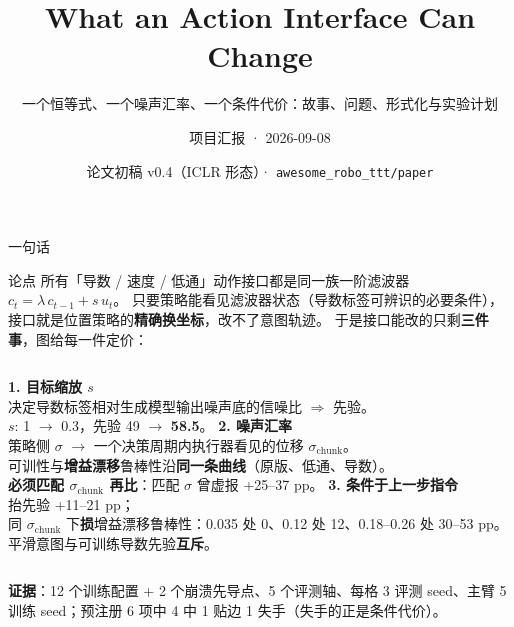 \documentclass[10pt,aspectratio=169]{beamer}
\title[What an Action Interface Can Change]{What an Action Interface Can Change}
\subtitle{一个恒等式、一个噪声汇率、一个条件代价：故事、问题、形式化与实验计划}
\author{项目汇报 · 2026-09-08}
\date{论文初稿 v0.4（ICLR 形态）· \texttt{awesome\_robo\_ttt/paper}}
\newcommand{\hl}[1]{\textcolor{good}{\textbf{#1}}}
\newcommand{\ba}[1]{\textcolor{bad}{\textbf{#1}}}
\newcommand{\schunk}{\sigma_{\mathrm{chunk}}}
\begin{document}
\begin{frame}
\titlepage
\end{frame}

\begin{frame}{一句话}
\begin{block}{论点}
所有「导数 / 速度 / 低通」动作接口都是同一族一阶滤波器 $c_t=\lambda\,c_{t-1}+s\,u_t$。
只要策略能看见滤波器状态（导数标签可辨识的必要条件），接口就是位置策略的\hl{精确换坐标}，改不了意图轨迹。
于是接口能改的只剩\textbf{三件事}，图给每一件定价：
\end{block}
\vspace{1mm}
\begin{columns}[T]
\textbf{1. 目标缩放 $s$}\\
决定导数标签相对生成模型输出噪声底的信噪比 $\Rightarrow$ 先验。\\
$s$: 1 $\to$ 0.3，先验 49 $\to$ \hl{58.5}。
\textbf{2. 噪声汇率}\\
策略侧 $\sigma$ $\to$ 一个决策周期内执行器看见的位移 $\schunk$。\\
可训性与\textbf{增益漂移}鲁棒性沿\hl{同一条曲线}（原版、低通、导数）。\\
\ba{必须匹配 $\schunk$ 再比}：匹配 $\sigma$ 曾虚报 +25–37 pp。
\textbf{3. 条件于上一步指令}\\
抬先验 +11–21 pp；\\
同 $\schunk$ 下\ba{损}增益漂移鲁棒性：0.035 处 0、0.12 处 12、0.18–0.26 处 30–53 pp。\\
平滑意图与可训练导数先验\textbf{互斥}。
\end{columns}
\vspace{2mm}
\small \textbf{证据}：12 个训练配置 + 2 个崩溃先导点、5 个评测轴、每格 3 评测 seed、主臂 5 训练 seed；预注册 6 项中 4 中 1 贴边 1 失手（失手的正是条件代价）。
\end{frame}
\end{document}
